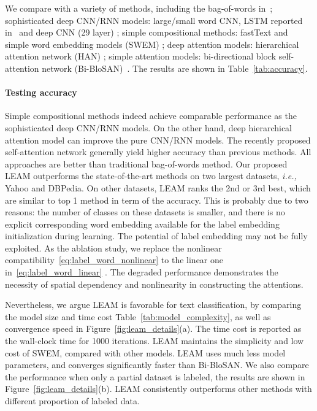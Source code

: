 \documentclass[11pt,a4paper]{article}
\newcommand{\ie}[0]{\emph{i.e., }}
\begin{document}
We compare with a variety of methods, including 
 the bag-of-words in~\citep{zhang2015character}; 
 sophisticated deep CNN/RNN models: large/small word CNN,  LSTM reported in~\citep{zhang2015character,dai2015semi} and deep CNN (29 layer) \citep{conneau2017very};
 simple compositional methods: fastText \citep{joulin2016bag} and simple word embedding models (SWEM) \citep{shen2018on};
 deep attention models: hierarchical attention network (HAN) \citep{yang2016hierarchical};
 simple attention models: bi-directional block self-attention network
(Bi-BloSAN)~\citep{shen2018bi}.
The results are shown in Table~\ref{tab:accuracy}. 

\paragraph{Testing accuracy} Simple compositional methods indeed achieve comparable performance as the sophisticated deep CNN/RNN models. On the other hand, deep hierarchical attention model can improve the pure CNN/RNN models. The recently proposed self-attention network generally yield higher accuracy than previous methods. All approaches are better than traditional bag-of-words method. Our proposed LEAM outperforms the state-of-the-art methods on two largest datasets, \ie Yahoo and DBPedia. On other datasets, LEAM ranks the 2nd or 3rd best, which are similar to top 1 method in term of the accuracy. This is probably due to two reasons: 
 the number of classes on these datasets is smaller, and
 there is no explicit corresponding word embedding available for the label embedding initialization during learning. The potential of label embedding may not be fully exploited. As the ablation study, we replace the nonlinear compatibility~\eqref{eq:label_word_nonlinear} to the linear one in~\eqref{eq:label_word_linear} . The degraded performance demonstrates the necessity of spatial dependency and nonlinearity in constructing the attentions.

Nevertheless, we argue LEAM is favorable for text classification, by comparing the model size and time cost Table~\ref{tab:model_complexity}, as well as convergence speed in Figure~\ref{fig:leam_details}(a). The time cost is reported as the wall-clock time for 1000 iterations. LEAM maintains the simplicity and low cost of SWEM, compared with other models. LEAM uses much less model parameters, and converges significantly faster than Bi-BloSAN.
We also compare the performance when only a partial dataset is labeled, the results are shown in Figure~\ref{fig:leam_details}(b). LEAM consistently  outperforms other methods with different proportion of labeled data.
\end{document}
